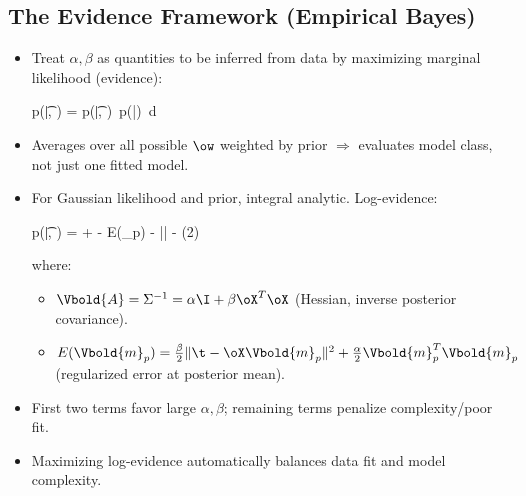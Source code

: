 \subsection*{The Evidence Framework (Empirical Bayes)}

\begin{itemize}
    \item Treat $\alpha, \beta$ as quantities to be inferred from data by maximizing \alert{marginal likelihood} (evidence):
    \begin{myequation}
    p(\t|\alpha, \beta) = \int p(\t|\ow, \beta)\, p(\ow|\alpha)\, d\ow
    \end{myequation}
    \item Averages over all possible $\ow$ weighted by prior $\Rightarrow$ evaluates model class, not just one fitted model.
    \item For Gaussian likelihood and prior, integral analytic. Log-evidence:
    \begin{myequation}
    \log p(\t|\alpha, \beta)
    = \log \alpha
    + \log \beta
    - E(_p)
    - \log ||
    - \log(2\pi)
    \end{myequation}
    where:
    \begin{itemize}
        \item $\Vbold{A} = \Sigma^{-1} = \alpha\I + \beta\oX^T\oX$ (Hessian, inverse posterior covariance).
        \item $E(\Vbold{m}_p) = \frac{\beta}{2}\|\t - \oX\Vbold{m}_p\|^2 + \frac{\alpha}{2}\Vbold{m}_p^T\Vbold{m}_p$ (regularized error at posterior mean).
    \end{itemize}
    \item First two terms favor large $\alpha,\beta$; remaining terms penalize complexity/poor fit.
    \item Maximizing log-evidence automatically balances data fit and model complexity.
\end{itemize}

